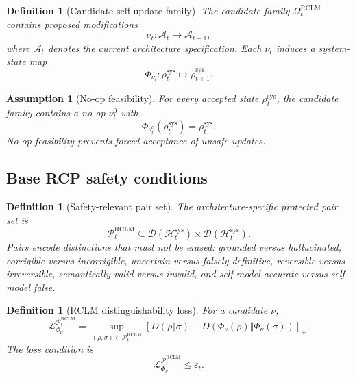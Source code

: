 \documentclass[11pt,a4paper]{article}
\newtheorem{definition}[theorem]{Definition}
\newtheorem{assumption}[theorem]{Assumption}
\newcommand{\D}{\mathcal D}
\newcommand{\Hcal}{\mathcal H}
\newcommand{\Lcal}{\mathcal L}
\newcommand{\Pcal}{\mathcal P}
\newcommand{\eps}{\varepsilon}
\newcommand{\RCLM}{\mathrm{RCLM}}
\newcommand{\sys}{\mathrm{sys}}
\begin{document}
\begin{definition}[Candidate self-update family]
The candidate family \(\Omega_t^{\RCLM}\) contains proposed modifications
\[
\nu_t:\mathcal A_t\to\mathcal A_{t+1},
\]
where \(\mathcal A_t\) denotes the current architecture specification. Each \(\nu_t\) induces a system-state map
\[
\Phi_{\nu_t}:\rho_t^{\sys}\mapsto\tilde\rho_{t+1}^{\sys}.
\]
\end{definition}

\begin{assumption}[No-op feasibility]
For every accepted state \(\rho_t^{\sys}\), the candidate family contains a no-op \(\nu_t^0\) with
\[
\Phi_{\nu_t^0}(\rho_t^{\sys})=\rho_t^{\sys}.
\]
No-op feasibility prevents forced acceptance of unsafe updates.
\end{assumption}

\subsection{Base RCP safety conditions}

\begin{definition}[Safety-relevant pair set]
The architecture-specific protected pair set is
\[
\Pcal_t^{\RCLM}\subseteq \D(\Hcal_t^{\sys})\times\D(\Hcal_t^{\sys}).
\]
Pairs encode distinctions that must not be erased: grounded versus hallucinated, corrigible versus incorrigible, uncertain versus falsely definitive, reversible versus irreversible, semantically valid versus invalid, and self-model accurate versus self-model false.
\end{definition}

\begin{definition}[RCLM distinguishability loss]
For a candidate \(\nu\),
\[
\Lcal^{\Pcal_t^{\RCLM}}_{\Phi_\nu}
=
\sup_{(\rho,\sigma)\in\Pcal_t^{\RCLM}}
\left[D(\rho\Vert\sigma)-D(\Phi_\nu(\rho)\Vert\Phi_\nu(\sigma))\right]_+.
\]
The loss condition is
\[
\Lcal^{\Pcal_t^{\RCLM}}_{\Phi_\nu}\le \eps_t.
\]
\end{definition}
\end{document}
